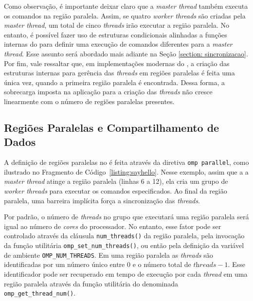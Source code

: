 \documentclass{SBCbookchapter}
\begin{document}
		Como observação, é importante deixar claro que a \textit{master
		thread} também executa os comandos na região paralela. Assim, se
		quatro \textit{worker threads} são criadas pela \textit{master
		thread}, um total de cinco \textit{threads} irão executar a
		região paralela.  No entanto, é possível fazer uso de estruturas
		condicionais alinhadas a funções internas do \openmp para
		definir uma execução de comandos diferentes para a
		\textit{master thread}. Esse assunto será abordado mais adiante
		na Seção \ref{section: sincronizacao}. Por fim, vale ressaltar
		que, em implementações modernas do \openmp, a criação das
		estruturas internas para gerência das \textit{threads} em
		regiões paralelas é feita uma única vez, quando a primeira
		região paralela é encontrada. Dessa forma, a sobrecarga imposta
		na aplicação para a criação das \textit{threads} não cresce
		linearmente com o número de regiões paralelas presentes.

	\subsection{Regiões Paralelas e Compartilhamento de Dados}
	\label{subsection: regioes paralelas e compartilhamento de dados}

		A definição de regiões paralelas no \openmp é feita através da
		diretiva \texttt{omp parallel}, como ilustrado no Fragmento
		de Código~\ref{listing:sayhello}.  Nesse exemplo, assim que a a
		\textit{master thread} atinge a região paralela (linhas 6 a 12),
		ela cria um grupo de \textit{worker threads} para executar os
		comandos especificados. Ao final da região paralela, uma
		barreira implícita força a sincronização das \textit{threads}.
		
		Por padrão, o número de \textit{threads} no grupo que executará
		uma região paralela será igual ao número de \textit{cores} do
		processador. No entanto, esse fator pode ser controlado através
		da cláusula \texttt{num\_threads()} da região paralela, pela invocação
		da função utilitária \texttt{omp\_set\_num\_threads()}, ou então pela definição da
		variável de ambiente \texttt{OMP\_NUM\_THREADS}. Em uma região
		paralela as \textit{threads} são identificadas por um número
		único entre $0$ e o número total de $\textit{threads} - 1$.
		Esse identificador pode ser recuperado em tempo de execução por
		cada \textit{thread} em uma região paralela através da função utilitária do
		\openmp denominada \texttt{omp\_get\_thread\_num()}.
\end{document}
